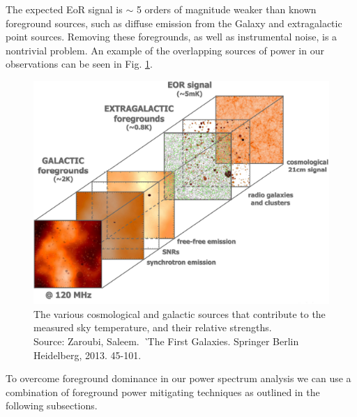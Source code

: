 \documentclass[a0,landscape]{a0poster}
\begin{document}
\begin{multicols}{4}
The expected EoR signal is $\sim$ 5 orders of magnitude weaker than known foreground sources, such as diffuse emission from the Galaxy and extragalactic point sources. Removing these foregrounds, as well as instrumental noise, is a nontrivial problem. An example of the overlapping sources of power in our observations can be seen in Fig. \ref{fig:foregroundsrcs}.


\begin{figure}[H]
\centering
\includegraphics[width=0.55\linewidth]{figures/foreground_figure.png}
\caption{The various cosmological and galactic sources that contribute to the measured sky temperature, and their relative strengths.\\\hspace{\textwidth}
Source: Zaroubi, Saleem. \textit`{The First Galaxies}. Springer Berlin Heidelberg, 2013. 45-101.}\label{fig:foregroundsrcs}
\end{figure}
To overcome foreground dominance in our power spectrum analysis we can use a combination of foreground power mitigating techniques as outlined in the following subsections.


\end{multicols}
\end{document}
